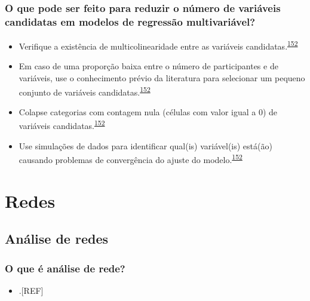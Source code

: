 \documentclass[
]{book}
\providecommand{\tightlist}{%
  \setlength{\itemsep}{0pt}\setlength{\parskip}{0pt}}
\begin{document}
\hypertarget{o-que-pode-ser-feito-para-reduzir-o-nuxfamero-de-variuxe1veis-candidatas-em-modelos-de-regressuxe3o-multivariuxe1vel}{%
\subsection{O que pode ser feito para reduzir o número de variáveis candidatas em modelos de regressão multivariável?}\label{o-que-pode-ser-feito-para-reduzir-o-nuxfamero-de-variuxe1veis-candidatas-em-modelos-de-regressuxe3o-multivariuxe1vel}}

\begin{itemize}
\item
  Verifique a existência de multicolinearidade entre as variáveis candidatas.\textsuperscript{\protect\hyperlink{ref-Sun1996}{152}}
\item
  Em caso de uma proporção baixa entre o número de participantes e de variáveis, use o conhecimento prévio da literatura para selecionar um pequeno conjunto de variáveis candidatas.\textsuperscript{\protect\hyperlink{ref-Sun1996}{152}}
\item
  Colapse categorias com contagem nula (células com valor igual a 0) de variáveis candidatas.\textsuperscript{\protect\hyperlink{ref-Sun1996}{152}}
\item
  Use simulações de dados para identificar qual(is) variável(is) está(ão) causando problemas de convergência do ajuste do modelo.\textsuperscript{\protect\hyperlink{ref-Sun1996}{152}}
\end{itemize}

\hypertarget{analise-redes}{%
\chapter{\texorpdfstring{\textbf{Redes}}{Redes}}\label{analise-redes}}

\hypertarget{redes}{%
\section{Análise de redes}\label{redes}}

\hypertarget{o-que-uxe9-anuxe1lise-de-rede}{%
\subsection{O que é análise de rede?}\label{o-que-uxe9-anuxe1lise-de-rede}}

\begin{itemize}
\tightlist
\item
  .{[}REF{]}
\end{itemize}
\end{document}
